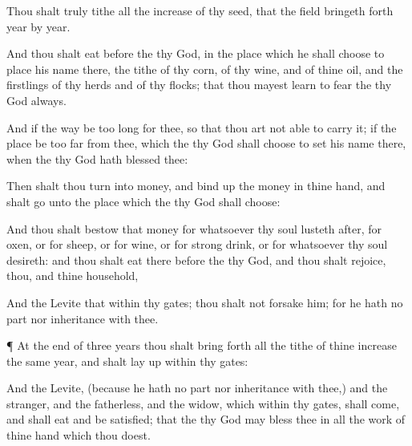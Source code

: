 {\par }{\PP {}Thou shalt
truly
tithe all the
increase of thy
seed, that the
field bringeth
forth
year by
year.

And thou shalt
eat
before the
{} thy
God, in the
place which he shall
choose to
place his
name there, the
tithe of thy
corn, of thy
wine, and of thine
oil, and the
firstlings of thy
herds and of thy
flocks; that thou mayest
learn to
fear the
{} thy
God
always.

And if the
way be too
long for thee, so
that thou art not
able to
carry it;
{} if the
place be too
far from thee, which the
{} thy
God shall
choose to
set his
name there, when the
{} thy
God hath
blessed thee:

Then shalt thou
turn
{} into
money, and bind
up the
money in thine
hand, and shalt
go unto the
place which the
{} thy
God shall
choose:

And thou shalt
bestow that
money for whatsoever thy
soul lusteth
after, for
oxen, or for
sheep, or for
wine, or for strong
drink, or for whatsoever thy
soul
desireth: and thou shalt
eat there
before the
{} thy
God, and thou shalt
rejoice, thou, and thine
household,

And the
Levite that
{} within thy
gates; thou shalt not
forsake him; for he hath no
part nor
inheritance with thee.


\par }{\PP {}¶ At the
end of
three
years thou shalt bring
forth all the
tithe of thine
increase the same
year, and shalt lay
{}
up within thy
gates:

And the
Levite, (because he hath no
part nor
inheritance with thee,) and the
stranger, and the
fatherless, and the
widow, which
{} within thy
gates, shall
come, and shall
eat and be
satisfied; that the
{} thy
God may
bless thee in all the
work of thine
hand which thou
doest.




\par }
